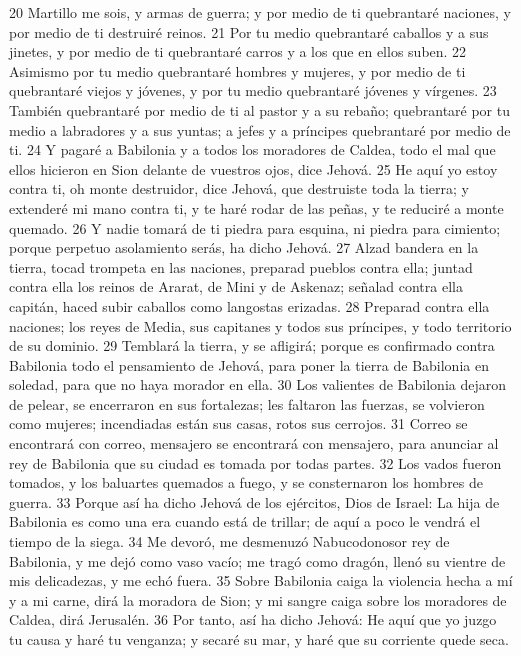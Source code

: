 20 Martillo me sois, y armas de guerra; y por medio de ti quebrantaré naciones, y por medio de ti destruiré reinos.
21 Por tu medio quebrantaré caballos y a sus jinetes, y por medio de ti quebrantaré carros y a los que en ellos suben.
22 Asimismo por tu medio quebrantaré hombres y mujeres, y por medio de ti quebrantaré viejos y jóvenes, y por tu medio quebrantaré jóvenes y vírgenes.
23 También quebrantaré por medio de ti al pastor y a su rebaño; quebrantaré por tu medio a labradores y a sus yuntas; a jefes y a príncipes quebrantaré por medio de ti.
24 Y pagaré a Babilonia y a todos los moradores de Caldea, todo el mal que ellos hicieron en Sion delante de vuestros ojos, dice Jehová.
25 He aquí yo estoy contra ti, oh monte destruidor, dice Jehová, que destruiste toda la tierra; y extenderé mi mano contra ti, y te haré rodar de las peñas, y te reduciré a monte quemado.
26 Y nadie tomará de ti piedra para esquina, ni piedra para cimiento; porque perpetuo asolamiento serás, ha dicho Jehová.
27 Alzad bandera en la tierra, tocad trompeta en las naciones, preparad pueblos contra ella; juntad contra ella los reinos de Ararat, de Mini y de Askenaz; señalad contra ella capitán, haced subir caballos como langostas erizadas.
28 Preparad contra ella naciones; los reyes de Media, sus capitanes y todos sus príncipes, y todo territorio de su dominio.
29 Temblará la tierra, y se afligirá; porque es confirmado contra Babilonia todo el pensamiento de Jehová, para poner la tierra de Babilonia en soledad, para que no haya morador en ella.
30 Los valientes de Babilonia dejaron de pelear, se encerraron en sus fortalezas; les faltaron las fuerzas, se volvieron como mujeres; incendiadas están sus casas, rotos sus cerrojos.
31 Correo se encontrará con correo, mensajero se encontrará con mensajero, para anunciar al rey de Babilonia que su ciudad es tomada por todas partes.
32 Los vados fueron tomados, y los baluartes quemados a fuego, y se consternaron los hombres de guerra.
33 Porque así ha dicho Jehová de los ejércitos, Dios de Israel: La hija de Babilonia es como una era cuando está de trillar; de aquí a poco le vendrá el tiempo de la siega.
34 Me devoró, me desmenuzó Nabucodonosor rey de Babilonia, y me dejó como vaso vacío; me tragó como dragón, llenó su vientre de mis delicadezas, y me echó fuera.
35 Sobre Babilonia caiga la violencia hecha a mí y a mi carne, dirá la moradora de Sion; y mi sangre caiga sobre los moradores de Caldea, dirá Jerusalén.
36 Por tanto, así ha dicho Jehová: He aquí que yo juzgo tu causa y haré tu venganza; y secaré su mar, y haré que su corriente quede seca.
